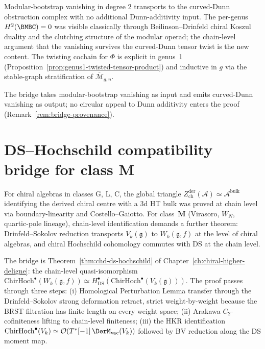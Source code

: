 Modular-bootstrap vanishing in degree \(2\) transports to the
curved-Dunn obstruction complex with no additional Dunn-additivity
input. The per-genus $H^{2}(\BMBC) = 0$ was visible classically through
Beilinson--Drinfeld chiral Koszul duality and the clutching structure
of the modular operad; the chain-level argument that the vanishing
survives the curved-Dunn tensor twist is the new content. The twisting
cochain for $\Phi$ is explicit in genus~1
(Proposition~\ref{prop:genus1-twisted-tensor-product}) and inductive in
$g$ via the stable-graph stratification of
$\overline{\mathcal{M}}_{g,n}$.

The bridge takes modular-bootstrap vanishing as input and emits
curved-Dunn vanishing as output; no circular appeal to Dunn additivity
enters the proof (Remark~\ref{rem:bridge-provenance}).

\section{DS--Hochschild compatibility bridge for class $\mathbf{M}$}
\label{sec:part-viii-ds-hochschild}

For chiral algebras in classes G, L, C, the global triangle
$Z^{\mathrm{der}}_{\mathrm{ch}}(\mathcal{A}) \simeq
\mathcal{A}^{\mathrm{bulk}}$ identifying the derived chiral centre
with a 3d HT bulk was proved at chain level via boundary-linearity and
Costello--Gaiotto. For class~$\mathbf{M}$ (Virasoro, $W_{N}$, quartic-pole
lineage), chain-level identification demands a further theorem:
Drinfeld--Sokolov reduction transports $V_{k}(\mathfrak{g})$ to
$W_{k}(\mathfrak{g},f)$ at the level of chiral algebras, and chiral
Hochschild cohomology commutes with DS at the chain level.

The bridge is Theorem~\ref{thm:chd-ds-hochschild} of
Chapter~\ref{ch:chiral-higher-deligne}: the chain-level
quasi-isomorphism
$\mathrm{ChirHoch}^{\bullet}(W_{k}(\mathfrak{g},f)) \simeq
H^{\bullet}_{\mathrm{DS}}(\mathrm{ChirHoch}^{\bullet}(V_{k}(\mathfrak{g})))$.
The proof passes through three steps: (i) Homological Perturbation
Lemma transfer through the Drinfeld--Sokolov strong deformation
retract, strict weight-by-weight because the BRST filtration has
finite length on every weight space; (ii) Arakawa $C_{2}$-cofiniteness
lifting to chain-level finiteness; (iii) the HKR identification
$\mathrm{ChirHoch}^{\bullet}(V_{k}) \simeq
\mathcal{O}(T^{\ast}[-1]\,\DerM_{\mathrm{vac}}(V_{k}))$ followed by
BV reduction along the DS moment map.

